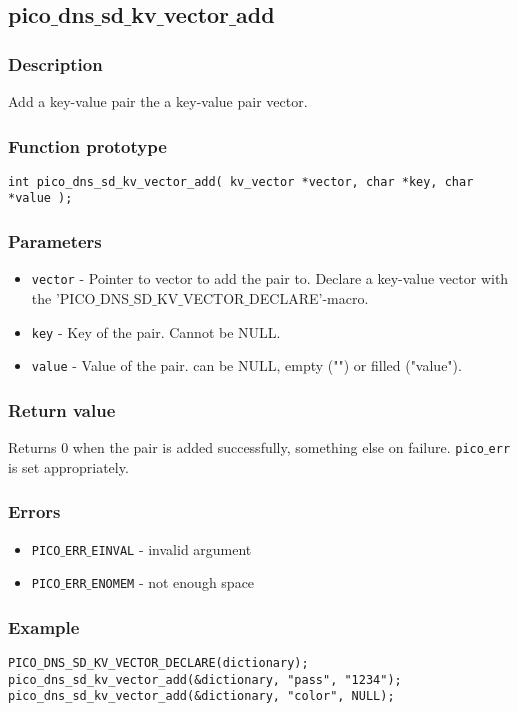 \subsection{pico$\_$dns$\_$sd$\_$kv$\_$vector$\_$add}

\subsubsection*{Description}
Add a key-value pair the a key-value pair vector.
\subsubsection*{Function prototype}
\begin{verbatim}
int pico_dns_sd_kv_vector_add( kv_vector *vector, char *key, char *value );
\end{verbatim}

\subsubsection*{Parameters}
\begin{itemize}[noitemsep]
\item \texttt{vector} - Pointer to vector to add the pair to. Declare a key-value vector with the 'PICO$\_$DNS$\_$SD$\_$KV$\_$VECTOR$\_$DECLARE'-macro.
\item \texttt{key} - Key of the pair. Cannot be NULL.
\item \texttt{value} - Value of the pair. can be NULL, empty ("") or filled ("value").
\end{itemize}

\subsubsection*{Return value}
Returns 0 when the pair is added successfully, something else on failure. \texttt{pico$\_$err} is set appropriately.

\subsubsection*{Errors}
\begin{itemize}[noitemsep]
\item \texttt{PICO$\_$ERR$\_$EINVAL} - invalid argument
\item \texttt{PICO$\_$ERR$\_$ENOMEM} - not enough space
\end{itemize}

\subsubsection*{Example}
\begin{verbatim}
PICO_DNS_SD_KV_VECTOR_DECLARE(dictionary);
pico_dns_sd_kv_vector_add(&dictionary, "pass", "1234");
pico_dns_sd_kv_vector_add(&dictionary, "color", NULL);
\end{verbatim}
